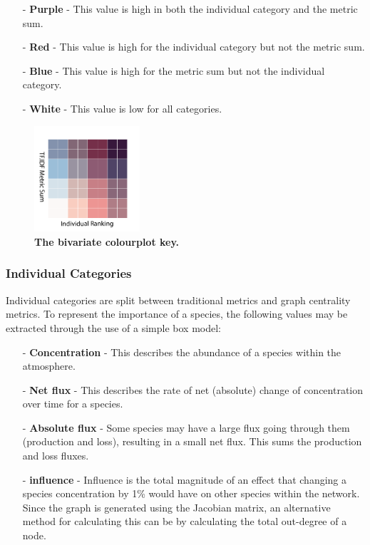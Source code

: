\begin{itemize}
\item[-] \textbf{Purple} - This value is high in both the individual category and the metric sum.
\item[-] \textbf{Red} - This value is high for the individual category but not the metric sum.
\item[-] \textbf{Blue} - This value is high for the metric sum but not the individual category.
\item[-] \textbf{White} - This value is low for all categories.
\end{itemize}



\begin{figure}[H]
     \centering
         \includegraphics[width=0.35\textwidth,angle=45]{figures_c3/mlpregressor/cbar.pdf}
        \caption{ \textbf{The bivariate colourplot key.} }
        \label{fig:cmap}
\end{figure}


\subsubsection{Individual Categories}
Individual categories are split between traditional metrics and graph centrality metrics. To represent the importance of a species, the following values may be extracted through the use of a simple box model:

\begin{itemize}
\item[-] \textbf{Concentration} - This describes the abundance of a species within the atmosphere.
\item[-] \textbf{Net flux} - This describes the rate of net (absolute) change of concentration over time for a species.
\item[-] \textbf{Absolute flux} - Some species may have a large flux going through them (production and loss), resulting in a small net flux. This sums the production and loss fluxes.
\item[-] \textbf{ influence} - Influence is the total magnitude of an effect that changing a species concentration by 1\% would have on other species within the network. Since the graph is generated using the Jacobian matrix, an alternative method for calculating this can be by calculating the total out-degree of a node.
\end{itemize}



